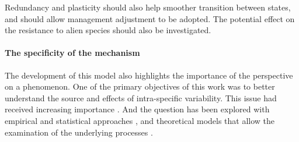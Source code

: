 Redundancy and plasticity should also help smoother transition between states, and should allow management adjustment to be adopted. The potential effect on the resistance to alien species should also be investigated.


%
%





%

\paragraph{The specificity of the mechanism}

The development of this model also highlights the importance of the perspective on a phenomenon. One of the primary objectives of this work was to better understand the source and effects of intra-specific variability. This issue had received increasing importance \parencite{de_bello_quantifying_2011, albert_when_2011, violle_return_2012, siefert_global_2015}. And the question has been explored with empirical and statistical approaches \parencite{jung_intraspecific_2010,  jung_intraspecific_2014, bennett_reciprocal_2016}, and theoretical models that allow the examination of the underlying processes \parencite{hart_how_2016}.

